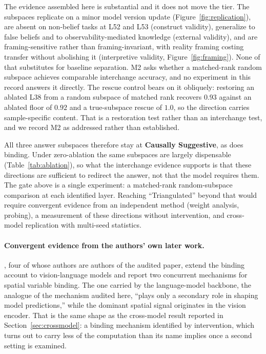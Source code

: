 \documentclass{article}
\begin{document}
The evidence assembled here is substantial and it does not move the tier. The subspaces
replicate on a minor model version update (Figure~\ref{fig:replication}), are absent on
non-belief tasks at L52 and L53 (construct validity), generalize to false beliefs and to
observability-mediated knowledge (external validity), and are framing-sensitive rather than
framing-invariant, with reality framing costing transfer without abolishing it (interpretive
validity, Figure~\ref{fig:framing}). None of that substitutes for baseline separation. M2
asks whether a matched-rank random subspace achieves comparable interchange accuracy, and no
experiment in this record answers it directly. The rescue control bears on it obliquely:
restoring an ablated L38 from a random subspace of matched rank recovers $0.93$ against an
ablated floor of $0.92$ and a true-subspace rescue of $1.0$, so the direction carries
sample-specific content. That is a restoration test rather than an interchange test, and we
record M2 as addressed rather than established.

All three answer subspaces therefore stay at \textbf{Causally Suggestive}, as does binding.
Under zero-ablation the same subspaces are largely dispensable (Table~\ref{tab:ablation}),
so what the interchange evidence supports is that these directions are sufficient to redirect
the answer, not that the model requires them. The gate above is a single experiment: a
matched-rank random-subspace comparison at each identified layer. Reaching ``Triangulated''
beyond that would require convergent evidence from an independent method (weight analysis,
probing), a measurement of these directions without intervention, and cross-model replication
with multi-seed statistics.

\paragraph{Convergent evidence from the authors' own later work.}
\citet{cui2026dual}, four of whose authors are authors of the audited paper, extend the
binding account to vision-language models and report two concurrent mechanisms for spatial
variable binding. The one carried by the language-model backbone, the analogue of the
mechanism audited here, ``plays only a secondary role in shaping model predictions,'' while
the dominant spatial signal originates in the vision encoder. That is the same shape as the
cross-model result reported in Section~\ref{sec:crossmodel}: a binding mechanism identified
by intervention, which turns out to carry less of the computation than its name implies once
a second setting is examined.
\end{document}
